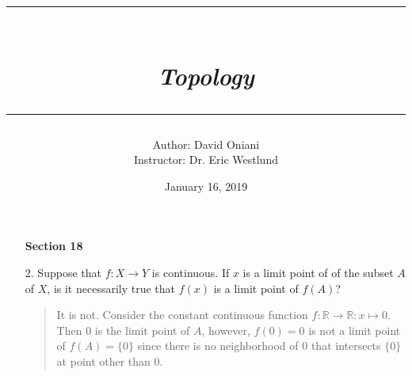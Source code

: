 \documentclass[12pt, a4paper]{article}
\title{\rule{\paperwidth - 150pt}{1pt}\textbf{\\\textit{Topology}\\}\rule{\paperwidth - 150pt}{1pt}}
\author
{
Author: David Oniani\\
Instructor: Dr. Eric Westlund
}
\date{January 16, 2019}
\newcommand{\reals}{\mathbb{R}} %
\newcommand{\rarr}{\rightarrow}
\begin{document}
\maketitle


\begin{itemize}
\item[]
\item[]
{\large \textbf{Section 18}}
\vspace{0.3cm}

\item[2.]
Suppose that $f : X \rarr Y$ is continuous. If $x$ is
a limit point of of the subset $A$ of $X$, is it necessarily
true that $f(x)$ is a limit point of $f(A)$?
\begin{quote}
It is not. Consider the constant continuous function $f : \reals \rarr \reals : x \mapsto 0$.
Then $0$ is the limit point of $A$, however, $f(0) = 0$ is not a limit point
of $f(A) = \{0\}$ since there is no neighborhood of $0$ that intersects $\{0\}$ at point other than $0$.
\end{quote}

\item[]
\item[]


\end{itemize}
\end{document}
